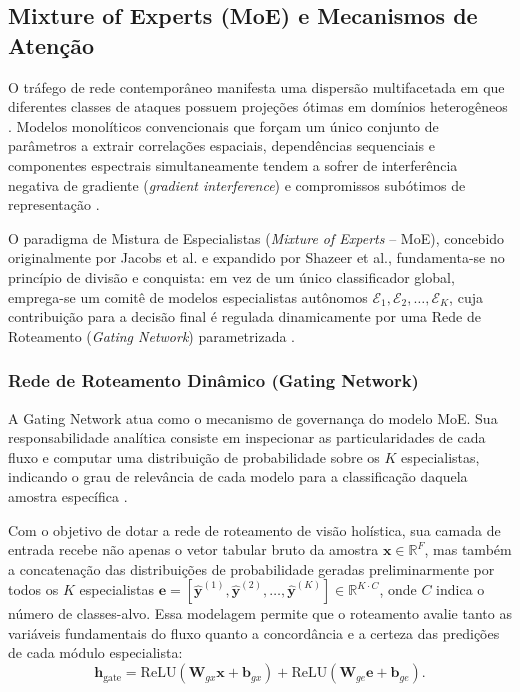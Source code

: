 \subsection{Mixture of Experts (MoE) e Mecanismos de Atenção}
\label{subsec:moe_e_atencao}

O tráfego de rede contemporâneo manifesta uma dispersão multifacetada em que diferentes classes de ataques possuem projeções ótimas em domínios heterogêneos \cite{alfmoe2026, trafficmoe2026}. Modelos monolíticos convencionais que forçam um único conjunto de parâmetros a extrair correlações espaciais, dependências sequenciais e componentes espectrais simultaneamente tendem a sofrer de interferência negativa de gradiente (\emph{gradient interference}) e compromissos subótimos de representação \cite{moevd2025}.

O paradigma de Mistura de Especialistas (\emph{Mixture of Experts} -- MoE), concebido originalmente por Jacobs et al. e expandido por Shazeer et al., fundamenta-se no princípio de divisão e conquista: em vez de um único classificador global, emprega-se um comitê de modelos especialistas autônomos $\mathcal{E}_1, \mathcal{E}_2, \dots, \mathcal{E}_K$, cuja contribuição para a decisão final é regulada dinamicamente por uma Rede de Roteamento (\emph{Gating Network}) parametrizada \cite{alfmoe2026}.

\subsubsection{Rede de Roteamento Dinâmico (Gating Network)}

A Gating Network atua como o mecanismo de governança do modelo MoE. Sua responsabilidade analítica consiste em inspecionar as particularidades de cada fluxo e computar uma distribuição de probabilidade sobre os $K$ especialistas, indicando o grau de relevância de cada modelo para a classificação daquela amostra específica \cite{trafficmoe2026}.

Com o objetivo de dotar a rede de roteamento de visão holística, sua camada de entrada recebe não apenas o vetor tabular bruto da amostra $\mathbf{x} \in \mathbb{R}^F$, mas também a concatenação das distribuições de probabilidade geradas preliminarmente por todos os $K$ especialistas $\mathbf{e} = [\hat{\mathbf{y}}^{(1)}, \hat{\mathbf{y}}^{(2)}, \dots, \hat{\mathbf{y}}^{(K)}] \in \mathbb{R}^{K \cdot C}$, onde $C$ indica o número de classes-alvo. Essa modelagem permite que o roteamento avalie tanto as variáveis fundamentais do fluxo quanto a concordância e a certeza das predições de cada módulo especialista:
\begin{equation}
\label{eq:gating_hidden}
\mathbf{h}_{\mathrm{gate}} = \mathrm{ReLU} \left( \mathbf{W}_{gx} \mathbf{x} + \mathbf{b}_{gx} \right) + \mathrm{ReLU} \left( \mathbf{W}_{ge} \mathbf{e} + \mathbf{b}_{ge} \right).
\end{equation}

